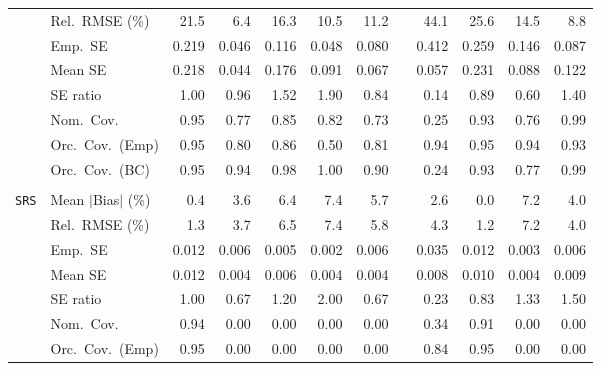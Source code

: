 \begin{landscape}
\begin{longtable}{llrrrrrrrrrr}
 & Rel.\ RMSE (\%) & 21.5 & \cellcolor{rankone}6.4 & 16.3 & \cellcolor{rankthree}10.5 & 11.2 &  & 44.1 & 25.6 & 14.5 & \cellcolor{ranktwo}8.8 \\
 & Emp.\ SE & 0.219 & 0.046 & 0.116 & 0.048 & 0.080 &  & 0.412 & 0.259 & 0.146 & 0.087 \\
 & Mean SE & 0.218 & 0.044 & 0.176 & 0.091 & 0.067 &  & 0.057 & 0.231 & 0.088 & 0.122 \\
 & SE ratio & \cellcolor{rankone}1.00 & \cellcolor{ranktwo}0.96 & 1.52 & 1.90 & 0.84 &  & 0.14 & \cellcolor{rankthree}0.89 & 0.60 & 1.40 \\
 & Nom.\ Cov. & \cellcolor{rankone}0.95 & 0.77 & 0.85 & 0.82 & 0.73 &  & 0.25 & \cellcolor{ranktwo}0.93 & 0.76 & \cellcolor{rankthree}0.99 \\
 & Orc.\ Cov.\ (Emp) & \cellcolor{rankone}0.95 & 0.80 & 0.86 & 0.50 & 0.81 &  & \cellcolor{ranktwo}0.94 & \cellcolor{rankone}0.95 & \cellcolor{ranktwo}0.94 & \cellcolor{rankthree}0.93 \\
 & Orc.\ Cov.\ (BC) & \cellcolor{rankone}0.95 & \cellcolor{ranktwo}0.94 & 0.98 & 1.00 & 0.90 &  & 0.24 & \cellcolor{rankthree}0.93 & 0.77 & 0.99 \\
\addlinespace[2pt]
\multicolumn{12}{l}{\textbf{Interaction}} \\
\addlinespace[2pt]
\quad \texttt{SRS} & Mean $|$Bias$|$ (\%) & \cellcolor{ranktwo}0.4 & 3.6 & 6.4 & 7.4 & 5.7 &  & \cellcolor{rankthree}2.6 & \cellcolor{rankone}0.0 & 7.2 & 4.0 \\
 & Rel.\ RMSE (\%) & \cellcolor{ranktwo}1.3 & \cellcolor{rankthree}3.7 & 6.5 & 7.4 & 5.8 &  & 4.3 & \cellcolor{rankone}1.2 & 7.2 & 4.0 \\
 & Emp.\ SE & 0.012 & 0.006 & 0.005 & 0.002 & 0.006 &  & 0.035 & 0.012 & 0.003 & 0.006 \\
 & Mean SE & 0.012 & 0.004 & 0.006 & 0.004 & 0.004 &  & 0.008 & 0.010 & 0.004 & 0.009 \\
 & SE ratio & \cellcolor{rankone}1.00 & 0.67 & \cellcolor{rankthree}1.20 & 2.00 & 0.67 &  & 0.23 & \cellcolor{ranktwo}0.83 & 1.33 & 1.50 \\
 & Nom.\ Cov. & \cellcolor{rankone}0.94 & 0.00 & 0.00 & 0.00 & 0.00 &  & \cellcolor{rankthree}0.34 & \cellcolor{ranktwo}0.91 & 0.00 & 0.00 \\
 & Orc.\ Cov.\ (Emp) & \cellcolor{rankone}0.95 & \cellcolor{rankthree}0.00 & \cellcolor{rankthree}0.00 & \cellcolor{rankthree}0.00 & \cellcolor{rankthree}0.00 &  & \cellcolor{ranktwo}0.84 & \cellcolor{rankone}0.95 & \cellcolor{rankthree}0.00 & \cellcolor{rankthree}0.00 \\

\end{longtable}
\end{landscape}
